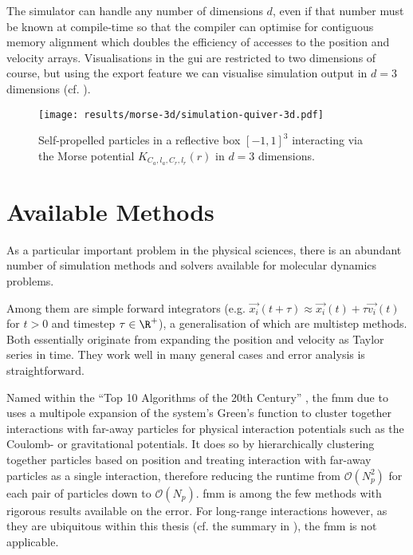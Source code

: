 The simulator can handle any number of dimensions $d$, even if that number must be known at compile-time so that the compiler can optimise for contiguous memory alignment which doubles the efficiency of accesses to the position and velocity arrays.
Visualisations in the \gls{gui} are restricted to two dimensions of course, but using the export feature we can visualise simulation output in $d=3$ dimensions (cf. ).

\begin{figure}[H]
  \centering
  \texttt{[image: results/morse-3d/simulation-quiver-3d.pdf]}
  \caption[Self-propelled particles in 3D interacting through $K_{C_a, l_a, C_r, l_r}(r)$]{Self-propelled particles in a reflective box $[-1, 1]^3$ interacting via the Morse potential $K_{C_a, l_a, C_r, l_r}(r)$ in $d=3$ dimensions.}
  \label{fig:morse-3d-quiver}
\end{figure}

\section{Available Methods}
As a particular important problem in the physical sciences, there is an abundant number of simulation methods and solvers available for molecular dynamics problems.

Among them are simple forward integrators (e.g. $\vec{x_i}(t + \tau) \approx \vec{x_i}(t) + \tau \vec{v_i}(t)$ for $t > 0$ and timestep $\tau \in \R^+$), a generalisation of which are multistep methods.
Both essentially originate from expanding the position and velocity as Taylor series in time.
They work well in many general cases and error analysis is straightforward.

Named within the ``Top 10 Algorithms of the 20th Century'' \parencite{2000-top-algorithms}, the \gls{fmm} due to \cite{1987-multipole-method} uses a multipole expansion of the system's Green's function to cluster together interactions with far-away particles for physical interaction potentials such as the Coulomb- or gravitational potentials.
It does so by hierarchically clustering together particles based on position and treating interaction with far-away particles as a single interaction, therefore reducing the runtime from $\mathcal{O}(N_p^2)$ for each pair of particles down to $\mathcal{O}(N_p)$.
\gls{fmm} is among the few methods with rigorous results available on the error.
For long-range interactions however, as they are ubiquitous within this thesis (cf. the summary in ), the \gls{fmm} is not applicable.

